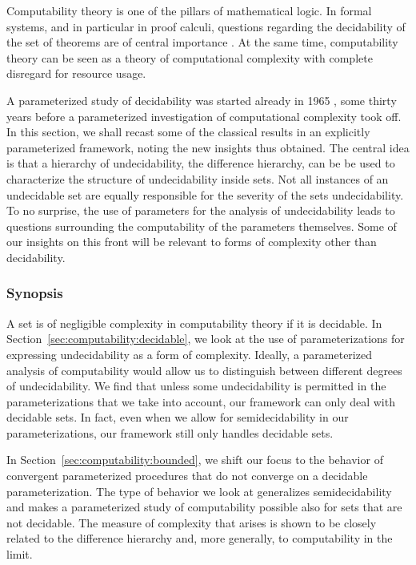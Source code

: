 \label{sec:computability}%

Computability theory \parencite{rogers1967theory} is one of the pillars of mathematical logic.
In formal systems, and in particular in proof calculi, questions regarding the decidability of the set of theorems are of central importance \parencite{kleene1967mathematical}.
At the same time, computability theory can be seen as a theory of computational complexity with complete disregard for resource usage.

A parameterized study of decidability was started already in 1965 \parencite{putnam1965trial,gold1965limiting}, some thirty years before a parameterized investigation of computational complexity took off.
In this section, we shall recast some of the classical results in an explicitly parameterized framework, noting the new insights thus obtained.
The central idea is that a hierarchy of undecidability, the difference hierarchy, can be be used to characterize the structure of undecidability inside sets.
Not all instances of an undecidable set are equally responsible for the severity of the sets undecidability.
To no surprise, the use of parameters for the analysis of undecidability leads to questions surrounding the computability of the parameters themselves.
Some of our insights on this front will be relevant to forms of complexity other than decidability.

\subsubsection{Synopsis}
A set is of negligible complexity in computability theory if it is decidable.
In Section~\ref{sec:computability:decidable}, we look at the use of parameterizations for expressing undecidability as a form of complexity.
Ideally, a parameterized analysis of computability would allow us to distinguish between different degrees of undecidability.
We find that unless some undecidability is permitted in the parameterizations that we take into account, our framework can only deal with decidable sets.
In fact, even when we allow for semidecidability in our parameterizations, our framework still only handles decidable sets.

In Section~\ref{sec:computability:bounded}, we shift our focus to the behavior of convergent parameterized procedures that do not converge on a decidable parameterization.
The type of behavior we look at generalizes semidecidability and makes a parameterized study of computability possible also for sets that are not decidable.
The measure of complexity that arises is shown to be closely related to the difference hierarchy and, more generally, to computability in the limit.


